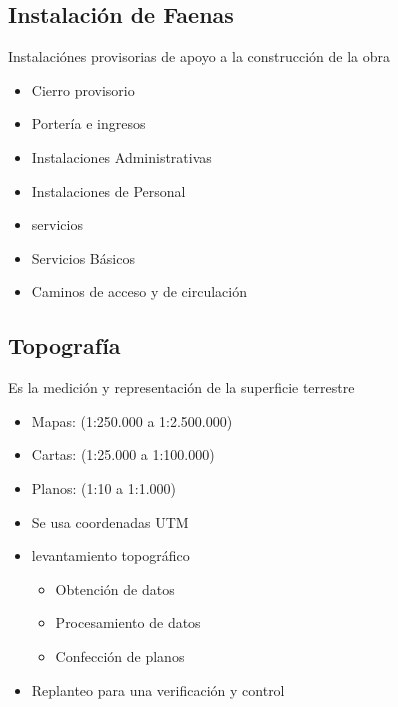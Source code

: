 \subsection{Instalación de Faenas}
Instalaciónes provisorias de apoyo a la construcción de la obra
\begin{itemize}
    \item Cierro provisorio
    \item Portería e ingresos
    \item Instalaciones Administrativas
    \item Instalaciones de Personal
    \item servicios
    \item Servicios Básicos
    \item Caminos de acceso y de circulación
\end{itemize}
\subsection{Topografía}
Es la medición y representación de la superficie terrestre
\begin{itemize}
    \item Mapas: (1:250.000 a 1:2.500.000)
    \item Cartas: (1:25.000 a 1:100.000)
    \item Planos: (1:10 a 1:1.000)
    \item Se usa coordenadas UTM
    \item levantamiento topográfico
    \begin{itemize}
        \item Obtención de datos
        \item Procesamiento de datos
        \item Confección de planos
    \end{itemize}
    \item Replanteo para una verificación y control
\end{itemize}